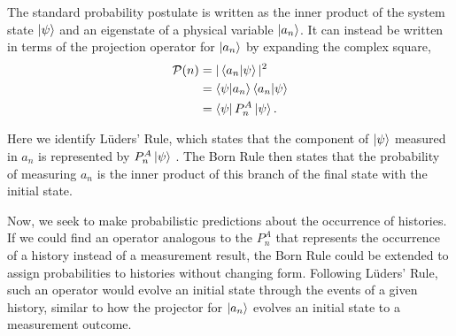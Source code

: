 The standard probability postulate is written as the inner product of the system state $\ket{\psi}$ and an eigenstate of a physical variable $\ket{a_n}$. It can instead be written in terms of the projection operator for $\ket{a_n}$ by expanding the complex square,
\begin{align}
        \mathcal{P}(n) &= |\braket{a_n|\psi}|^2 \\ \nonumber
        &= \braket{\psi|a_n} \braket{a_n|\psi} \\ \nonumber
        &= \bra{\psi} P^A_n \ket{\psi}.
\end{align}

Here we identify Lüders' Rule, which states that the component of $\ket{\psi}$ measured in $a_n$ is represented by $P^A_n \ket{\psi}$ \cite{Hegerfeldt}. The Born Rule then states that the probability of measuring $a_n$ is the inner product of this branch of the final state with the initial state.

Now, we seek to make probabilistic predictions about the occurrence of histories. If we could find an operator analogous to the $P^A_n$ that represents the occurrence of a history instead of a measurement result, the Born Rule could be extended to assign probabilities to histories without changing form. Following Lüders' Rule, such an operator would evolve an initial state through the events of a given history, similar to how the projector for $\ket{a_n}$ evolves an initial state to a measurement outcome.

